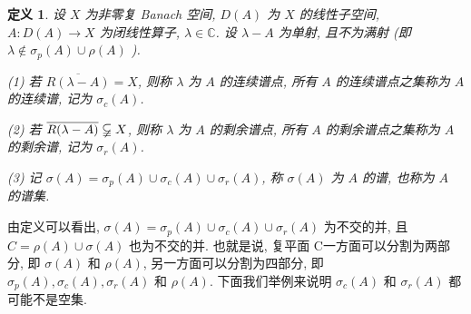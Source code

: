 \documentclass[openany]{ctexbook}
\theoremstyle{kaiti}
\newtheorem{definition}{定义}[section]
\theoremstyle{normal}
\begin{document}
\begin{definition}
设 $X$ 为非零复 Banach 空间, $D(A)$ 为 $X$ 的线性子空间, $A: D(A) \rightarrow X$ 为闭线性算子, $\lambda \in \mathbb{C}$. 设 $\lambda-A$ 为单射, 且不为满射 (即 $\lambda \notin \sigma_{p}(A) \cup \rho(A)$ ).

(1) 若 $\overline{R(\lambda-A)}=X$, 则称 $\lambda$ 为 $A$ 的连续谱点, 所有 $A$ 的连续谱点之集称为 $A$ 的连续谱, 记为 $\sigma_{c}(A)$.

(2) 若 $\overline{R(\lambda-A)} \varsubsetneqq X$, 则称 $\lambda$ 为 $A$ 的剩余谱点, 所有 $A$ 的剩余谱点之集称为 $A$ 的剩余谱, 记为 $\sigma_{r}(A)$.

(3) 记 $\sigma(A)=\sigma_{p}(A) \cup \sigma_{c}(A) \cup \sigma_{r}(A)$, 称 $\sigma(A)$ 为 $A$ 的谱, 也称为 $A$ 的谱集.
\end{definition}

由定义可以看出, $\sigma(A)=\sigma_{p}(A) \cup \sigma_{c}(A) \cup \sigma_{r}(A)$ 为不交的并, 且 $C=\rho(A) \cup \sigma(A)$ 也为不交的并. 也就是说, 复平面 C一方面可以分割为两部分, 即 $\sigma(A)$ 和 $\rho(A)$, 另一方面可以分割为四部分, 即 $\sigma_{p}(A), \sigma_{c}(A), \sigma_{r}(A)$ 和 $\rho(A)$. 下面我们举例来说明 $\sigma_{c}(A)$ 和 $\sigma_{r}(A)$ 都可能不是空集.
\end{document}

